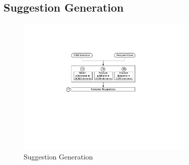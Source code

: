 	\subsection{Suggestion Generation}
	\label{Sec:Suggestions}
		\begin{figure}
			\centering
			\includegraphics[width=85mm]{images/suggestions.pdf}
			\caption{Suggestion Generation}
			\label{Fig:Suggestions}
		\end{figure}